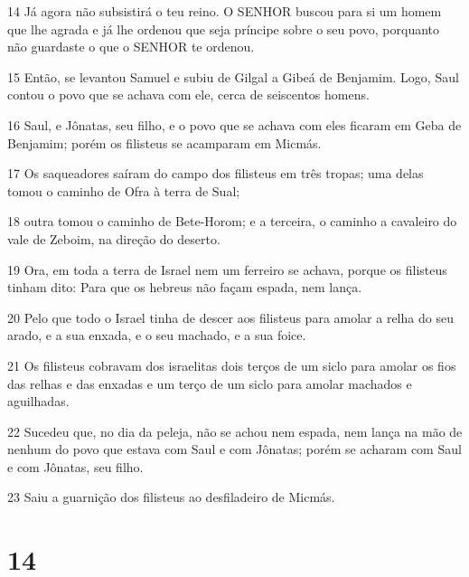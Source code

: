 \par 14 Já agora não subsistirá o teu reino. O SENHOR buscou para si um homem que lhe agrada e já lhe ordenou que seja príncipe sobre o seu povo, porquanto não guardaste o que o SENHOR te ordenou.
\par 15 Então, se levantou Samuel e subiu de Gilgal a Gibeá de Benjamim. Logo, Saul contou o povo que se achava com ele, cerca de seiscentos homens.
\par 16 Saul, e Jônatas, seu filho, e o povo que se achava com eles ficaram em Geba de Benjamim; porém os filisteus se acamparam em Micmás.
\par 17 Os saqueadores saíram do campo dos filisteus em três tropas; uma delas tomou o caminho de Ofra à terra de Sual;
\par 18 outra tomou o caminho de Bete-Horom; e a terceira, o caminho a cavaleiro do vale de Zeboim, na direção do deserto.
\par 19 Ora, em toda a terra de Israel nem um ferreiro se achava, porque os filisteus tinham dito: Para que os hebreus não façam espada, nem lança.
\par 20 Pelo que todo o Israel tinha de descer aos filisteus para amolar a relha do seu arado, e a sua enxada, e o seu machado, e a sua foice.
\par 21 Os filisteus cobravam dos israelitas dois terços de um siclo para amolar os fios das relhas e das enxadas e um terço de um siclo para amolar machados e aguilhadas.
\par 22 Sucedeu que, no dia da peleja, não se achou nem espada, nem lança na mão de nenhum do povo que estava com Saul e com Jônatas; porém se acharam com Saul e com Jônatas, seu filho.
\par 23 Saiu a guarnição dos filisteus ao desfiladeiro de Micmás.

\chapter{14}

